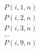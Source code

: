 \documentclass[preview]{standalone}
\begin{document}
\begin{align*}
P(i,1,n)\\P(i,2,n)\\P(i,3,n)\\...\\P(i,9,n)
\end{align*}
\end{document}
